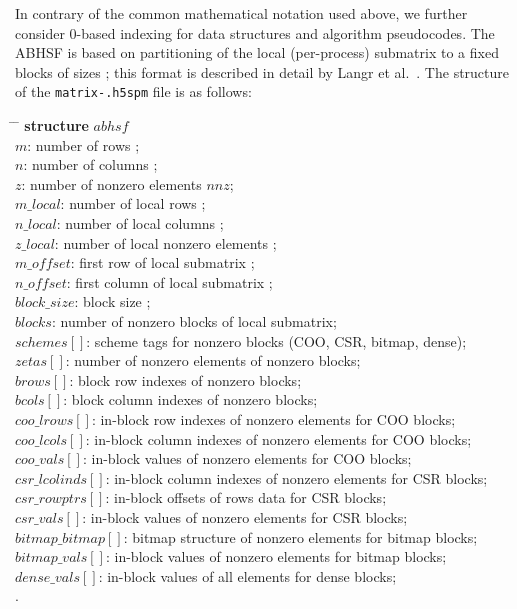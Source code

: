 \documentclass[10pt,a4paper]{article}
\providecommand{\nnz}{\ensuremath{\mathit{nnz}}\xspace}
\providecommand{\var}[1]{\ensuremath{\mathit{#1}}\xspace}
\begin{document}
In contrary of the common mathematical notation used above, we further consider 0-based indexing for data structures and algorithm pseudocodes. The ABHSF is based on partitioning of the local (per-process) submatrix to a fixed blocks of sizes ; this format is described in detail by Langr et al.~\cite{Langr:2012b}. The structure of the \texttt{matrix-}\texttt{.h5spm} file is as follows:
\begin{tabbing}
\hspace*{1em} \= \hspace*{8em} \= \kill
\textbf{structure} \var{abhsf}  \\
\> \var{m}:           \> number of rows ; \\
\> \var{n}:           \> number of columns ; \\
\> \var{z}:           \> number of nonzero elements \nnz; \\
\> \var{m\_local}:    \> number of local rows ; \\
\> \var{n\_local}:    \> number of local columns ; \\
\> \var{z\_local}:    \> number of local nonzero elements ; \\
\> \var{m\_offset}:   \> first row of local submatrix ; \\
\> \var{n\_offset}:   \> first column of local submatrix ; \\
\> \var{block\_size}: \> block size ; \\
\> \var{blocks}:      \> number of nonzero blocks of local submatrix; \\
\> \var{schemes[]}:   \> scheme tags for nonzero blocks (COO, CSR, bitmap, dense); \\
\> \var{zetas[]}:     \> number of nonzero elements of nonzero blocks; \\
\> \var{brows[]}:     \> block row indexes of nonzero blocks; \\
\> \var{bcols[]}:     \> block column indexes of nonzero blocks; \\
\> \var{coo\_lrows[]}:     \> in-block row indexes of nonzero elements for COO blocks; \\
\> \var{coo\_lcols[]}:     \> in-block column indexes of nonzero elements for COO blocks; \\
\> \var{coo\_vals[]}:      \> in-block values of nonzero elements for COO blocks; \\
\> \var{csr\_lcolinds[]}:  \> in-block column indexes of nonzero elements for CSR blocks; \\
\> \var{csr\_rowptrs[]}:   \> in-block offsets of rows data for CSR blocks; \\
\> \var{csr\_vals[]}:      \> in-block values of nonzero elements for CSR blocks; \\
\> \var{bitmap\_bitmap[]}: \> bitmap structure of nonzero elements for bitmap blocks; \\
\> \var{bitmap\_vals[]}:   \> in-block values of nonzero elements for bitmap blocks; \\
\> \var{dense\_vals[]}:    \> in-block values of all elements for dense blocks; \\
.
\end{tabbing}
\end{document}
